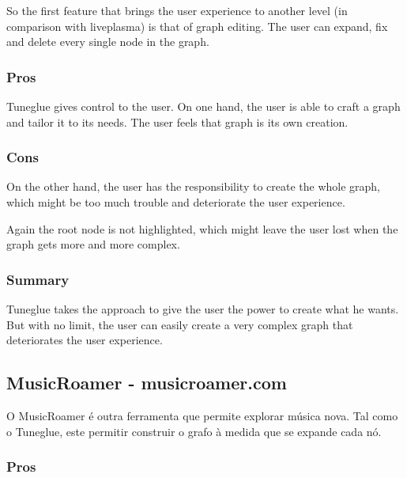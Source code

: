 So the first feature that brings the user experience to another level (in comparison with liveplasma) is that of graph editing.
The user can expand, fix and delete every single node in the graph.


\subsubsection{Pros} %
\label{ssub:audiomap_pros}

Tuneglue gives control to the user.
On one hand, the user is able to craft a graph and tailor it to its needs.
The user feels that graph is its own creation.


\subsubsection{Cons} %
\label{ssub:audiomap_cons}

On the other hand, the user has the responsibility to create the whole graph, which might be too much trouble and deteriorate the user experience.

Again the root node is not highlighted, which might leave the user lost when the graph gets more and more complex.


\subsubsection{Summary} %
\label{ssub:audiomap_summary}

Tuneglue takes the approach to give the user the power to create what he wants.
But with no limit, the user can easily create a very complex graph that deteriorates the user experience.




\subsection{MusicRoamer - musicroamer.com} %
\label{sub:musicroamer}

  O MusicRoamer é outra ferramenta que permite explorar música nova.
  Tal como o Tuneglue, este permitir construir o grafo à medida que se expande cada nó.



  \subsubsection{Pros} %
  \label{ssub:pros}

